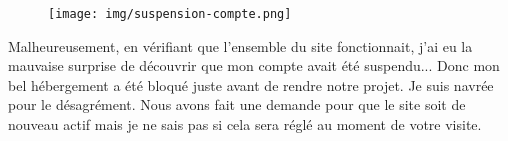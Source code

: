         \newpage
        \begin{figure}[!ht]
            \centering
            \texttt{[image: img/suspension-compte.png]}
        \end{figure}

        Malheureusement, en vérifiant que l'ensemble du site fonctionnait, j'ai eu la mauvaise surprise de découvrir que mon compte avait été suspendu... Donc mon bel hébergement a été bloqué juste avant de rendre notre projet. Je suis navrée pour le désagrément. Nous avons fait une demande pour que le site soit de nouveau actif mais je ne sais pas si cela sera réglé au moment de votre visite.